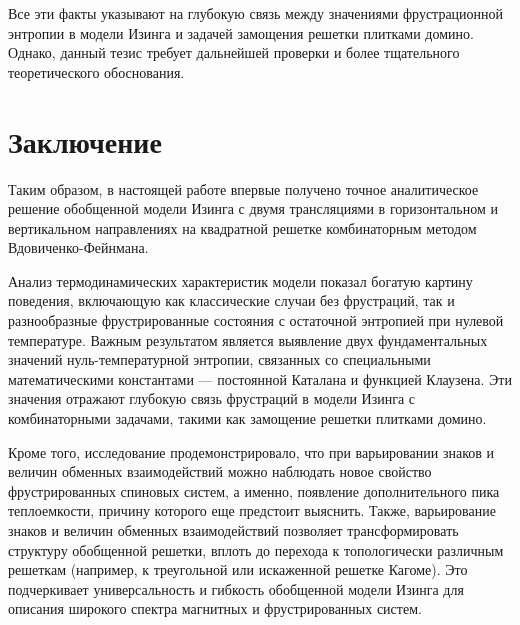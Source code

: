 \documentclass[utf8,12pt]{jetp}
\begin{document}
Все эти факты указывают на глубокую связь между значениями фрустрационной энтропии в модели Изинга и задачей замощения решетки плитками домино. Однако, данный тезис требует дальнейшей проверки и более тщательного теоретического обоснования.

%

\section{Заключение}
		
Таким образом, в настоящей работе впервые получено точное аналитическое решение обобщенной модели Изинга с двумя трансляциями в горизонтальном и вертикальном направлениях на квадратной решетке комбинаторным методом Вдовиченко-Фейнмана. 

Анализ термодинамических характеристик модели показал богатую картину поведения, включающую как классические случаи без фрустраций, так и разнообразные фрустрированные состояния с остаточной энтропией при нулевой температуре. Важным результатом является выявление двух фундаментальных значений нуль-температурной энтропии, связанных со специальными математическими константами — постоянной Каталана и функцией Клаузена. Эти значения отражают глубокую связь фрустраций в модели Изинга с комбинаторными задачами, такими как замощение решетки плитками домино.

Кроме того, исследование продемонстрировало, что при варьировании знаков и величин обменных взаимодействий можно наблюдать новое свойство фрустрированных спиновых систем, а именно, появление дополнительного пика теплоемкости, причину которого еще предстоит выяснить. Также, варьирование знаков и величин обменных взаимодействий позволяет трансформировать структуру обобщенной решетки, вплоть до перехода к топологически различным решеткам (например, к треугольной или искаженной решетке Кагоме). Это подчеркивает универсальность и гибкость обобщенной модели Изинга для описания широкого спектра магнитных и фрустрированных систем.
\end{document}
